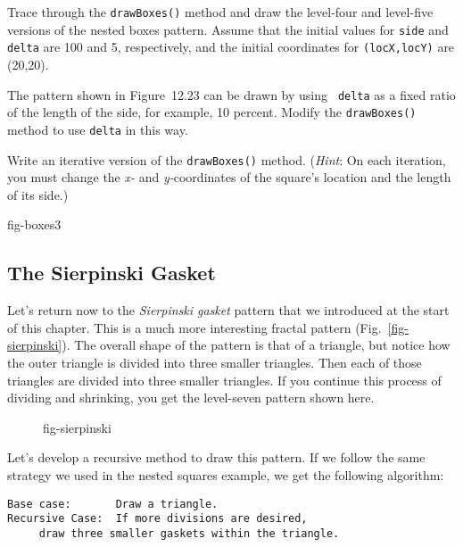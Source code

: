 \label{self-study-exercises}
\begin{SSTUDY}

\item Trace through the {\tt drawBoxes()} method and draw the
level-four and level-five versions of the nested boxes pattern.
Assume that the initial values for {\tt side} and {\tt delta} are 100
and 5, respectively, and the initial coordinates for {\tt (locX,locY)}
are (20,20).

\item The pattern shown in Figure~12.23 can be drawn by using {\tt
delta} as a fixed ratio of the length of the side, for example, 10
percent.  Modify the {\tt drawBoxes()} method to use {\tt delta} in
this way.

\item Write an iterative version of the {\tt drawBoxes()} method.
({\it Hint}: On each iteration, you must change the {\it x-} and {\it
y-}coordinates of the square's location and the length of its side.)

{fig-boxes3}

\end{SSTUDY}

\subsection{The Sierpinski Gasket}
\noindent Let's return now to the {\it Sierpinski gasket} pattern that we
introduced at the start of this chapter.  This is a much more
interesting fractal pattern (Fig.~\ref{fig-sierpinski}). The overall
shape of the pattern is that of a triangle, but notice how the outer
triangle is divided into three smaller triangles.  Then each of those
triangles are divided into three smaller triangles.  If you continue
this process of dividing and shrinking, you get the level-seven pattern
shown here.

\begin{figure}[hbt]
{fig-sierpinski}
\end{figure}

Let's develop a recursive method to draw this pattern.  If we follow
the same strategy we used in the nested squares example, we get the
following algorithm:

\begin{jjjlisting}
\begin{lstlisting}
Base case:       Draw a triangle.
Recursive Case:  If more divisions are desired,
     draw three smaller gaskets within the triangle.
\end{lstlisting}
\end{jjjlisting}

